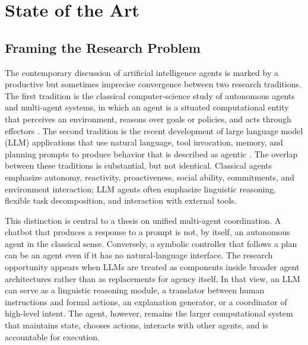 \chapter{State of the Art}
\label{chap:state-of-the-art}

\section{Framing the Research Problem}

The contemporary discussion of artificial intelligence agents is marked by a productive but sometimes imprecise convergence between two research traditions. The first tradition is the classical computer-science study of autonomous agents and multi-agent systems, in which an agent is a situated computational entity that perceives an environment, reasons over goals or policies, and acts through effectors \cite{wooldridge1995intelligent,russell2021artificial,jennings2000agent}. The second tradition is the recent development of large language model (LLM) applications that use natural language, tool invocation, memory, and planning prompts to produce behavior that is described as agentic \cite{brown2020language,wei2022chain,yao2023react,wang2024survey}. The overlap between these traditions is substantial, but not identical. Classical agents emphasize autonomy, reactivity, proactiveness, social ability, commitments, and environment interaction; LLM agents often emphasize linguistic reasoning, flexible task decomposition, and interaction with external tools.

This distinction is central to a thesis on unified multi-agent coordination. A chatbot that produces a response to a prompt is not, by itself, an autonomous agent in the classical sense. Conversely, a symbolic controller that follows a plan can be an agent even if it has no natural-language interface. The research opportunity appears when LLMs are treated as components inside broader agent architectures rather than as replacements for agency itself. In that view, an LLM can serve as a linguistic reasoning module, a translator between human instructions and formal actions, an explanation generator, or a coordinator of high-level intent. The agent, however, remains the larger computational system that maintains state, chooses actions, interacts with other agents, and is accountable for execution.

